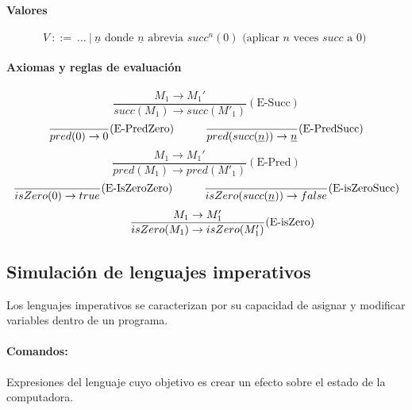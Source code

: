 \paragraph{Valores}
$$V~::=~\dots~|~\underline{n}\text{ donde } \underline{n} \text{ abrevia } succ^n(0) \text{ (aplicar $n$ veces $succ$ a $0$) }$$

\paragraph{Axiomas y reglas de evaluación}

\begin{equation*}
		\frac{M_1\to M_1'}{succ(M_1)\to succ(M'_1)}(\text{E-Succ})
	\end{equation*}
	\vspace*{5mm}
	\begin{equation*}
		\frac{}{pred(0)\to 0}(\text{E-PredZero})\hspace*{1cm}\frac{}{pred(succ(\underline{n}))\to \underline{n}}(\text{E-PredSucc})
	\end{equation*}
	\vspace*{5mm}
	\begin{equation*}
		\frac{M_1\to M_1'}{pred(M_1)\to pred(M'_1)}(\text{E-Pred})
	\end{equation*}
	\vspace*{5mm}
	\begin{equation*}
		\frac{}{isZero(0)\to true}(\text{E-IsZeroZero})\hspace*{1cm}\frac{}{isZero(succ(\underline{n}))\to false}(\text{E-isZeroSucc})
	\end{equation*}
	\vspace*{5mm}
	\begin{equation*}
		\hspace*{1cm}\frac{M_1\to M'_1}{isZero(M_1)\to isZero(M_1')}(\text{E-isZero})
	\end{equation*}



\subsection{Simulación de lenguajes imperativos}
Los lenguajes imperativos se caracterizan por su capacidad de asignar y modificar variables dentro de un programa.

\paragraph{Comandos:} Expresiones del lenguaje cuyo objetivo es crear un efecto sobre el estado de la computadora. 

